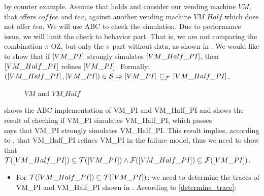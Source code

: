 \begin{prf}
by counter example. Assume that  holds and consider our vending machine $VM$, that offers $coffee$ and $tea$, against another vending machine $VM\_Half$ which does not offer $tea$. We will use ABC to check the simulation. Due to performance issue, we will limit the check to behavior part. That is, we are not comparing the combination $\pi$-OZ, but only the $\pi$ part   without data, as shown in . We would like to show that if $\left[VM\_PI\right]$ strongly simulates $\left[VM\_Half\_PI\right]$, then $\left[VM\_Half\_PI\right]$ refines $\left[VM\_PI\right]$. Formally: $(\ec{VM\_Half\_PI},\ec{VM\_PI})\in{}\simu  \Rightarrow \ec{VM\_PI} \refiF \ec{VM\_Half\_PI}$.
\begin{figure}[H]%
\centering
{}%
\qquad
{}%
\caption{$VM$ and $VM\_Half$}
\label{vm_and_vmHalf}
\end{figure}

 shows the ABC implementation of VM\_PI and VM\_Half\_PI and  shows the result of checking if VM\_PI simulates VM\_Half\_PI, which passes\\






 says that VM\_PI strongly simulates VM\_Half\_PI. This result implies, according to , that VM\_Half\_PI refines VM\_PI in the failure model, thus we need to show that $\traces[VM\_Half\_PI]\subseteq\traces[VM\_PI] \wedge \failures[VM\_Half\_PI]\subseteq\failures[VM\_PI]$.
\begin{itemize}
\item For $\traces[VM\_Half\_PI]\subseteq\traces[VM\_PI]$: we need to determine the traces of VM\_PI and VM\_Half\_PI  shown in . According to \ref{determine_trace}:


\end{itemize}
\end{prf}

